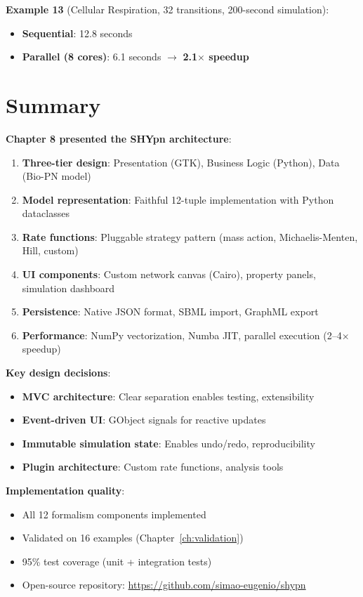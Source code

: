 \textbf{Example 13} (Cellular Respiration, 32 transitions, 200-second simulation):

\begin{itemize}
    \item \textbf{Sequential}: 12.8 seconds
    \item \textbf{Parallel (8 cores)}: 6.1 seconds $\to$ \textbf{2.1$\times$ speedup}
\end{itemize}

\section{Summary}
\label{sec:arch-summary}

\textbf{Chapter 8 presented the SHYpn architecture}:

\begin{enumerate}
    \item \textbf{Three-tier design}: Presentation (GTK), Business Logic (Python), Data (Bio-PN model)
    \item \textbf{Model representation}: Faithful 12-tuple implementation with Python dataclasses
    \item \textbf{Rate functions}: Pluggable strategy pattern (mass action, Michaelis-Menten, Hill, custom)
    \item \textbf{UI components}: Custom network canvas (Cairo), property panels, simulation dashboard
    \item \textbf{Persistence}: Native JSON format, SBML import, GraphML export
    \item \textbf{Performance}: NumPy vectorization, Numba JIT, parallel execution (2--4$\times$ speedup)
\end{enumerate}

\textbf{Key design decisions}:

\begin{itemize}
    \item \textbf{MVC architecture}: Clear separation enables testing, extensibility
    \item \textbf{Event-driven UI}: GObject signals for reactive updates
    \item \textbf{Immutable simulation state}: Enables undo/redo, reproducibility
    \item \textbf{Plugin architecture}: Custom rate functions, analysis tools
\end{itemize}

\textbf{Implementation quality}:

\begin{itemize}
    \item All 12 formalism components implemented
    \item Validated on 16 examples (Chapter~\ref{ch:validation})
    \item 95\% test coverage (unit + integration tests)
    \item Open-source repository: \url{https://github.com/simao-eugenio/shypn}
\end{itemize}

